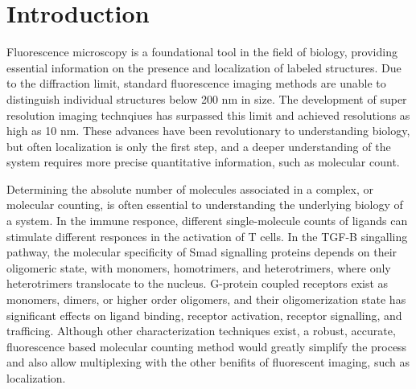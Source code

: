\section{Introduction}


Fluorescence microscopy is a foundational tool in the field of biology,
  providing essential information on the presence and localization 
  of labeled structures.
  Due to the diffraction limit, standard fluorescence imaging methods are unable to distinguish 
  individual structures below 200 nm in size.
  The development of super resolution imaging technqiues has surpassed 
  this limit and achieved resolutions as high as 10 nm.
  These advances have been revolutionary to understanding biology, 
  but often localization is only the first step,
  and a deeper understanding of the system requires more precise
  quantitative information, such as molecular count. 

Determining the absolute number of molecules associated in a complex, or molecular counting, is often essential to understanding the
  underlying biology of a system. 
  In the immune responce, different single-molecule counts of ligands can stimulate different responces in the activation of T cells.
  In the TGF-B singalling pathway, the molecular specificity of Smad signalling proteins depends on their oligomeric state,
  with monomers, homotrimers, and heterotrimers, where only heterotrimers translocate to the nucleus. 
  G-protein coupled receptors exist as monomers, dimers, or higher order oligomers, and their oligomerization state has significant effects
  on ligand binding, receptor activation, receptor signalling, and trafficing. 
  Although other characterization techniques exist, a robust, accurate, fluorescence based molecular counting 
  method would greatly simplify the process and also allow multiplexing with the other benifits of fluorescent imaging, such as localization.

